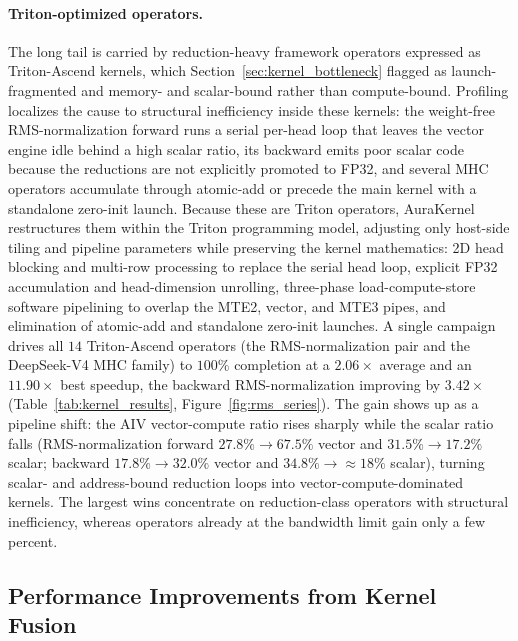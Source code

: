 \paragraph{Triton-optimized operators.}
The long tail is carried by reduction-heavy framework operators expressed as Triton-Ascend kernels, which Section~\ref{sec:kernel_bottleneck} flagged as launch-fragmented and memory- and scalar-bound rather than compute-bound. Profiling localizes the cause to structural inefficiency inside these kernels: the weight-free RMS-normalization forward runs a serial per-head loop that leaves the vector engine idle behind a high scalar ratio, its backward emits poor scalar code because the reductions are not explicitly promoted to FP32, and several MHC operators accumulate through atomic-add or precede the main kernel with a standalone zero-init launch. Because these are Triton operators, AuraKernel restructures them within the Triton programming model, adjusting only host-side tiling and pipeline parameters while preserving the kernel mathematics: 2D head blocking and multi-row processing to replace the serial head loop, explicit FP32 accumulation and head-dimension unrolling, three-phase load-compute-store software pipelining to overlap the MTE2, vector, and MTE3 pipes, and elimination of atomic-add and standalone zero-init launches. A single campaign drives all $14$ Triton-Ascend operators (the RMS-normalization pair and the DeepSeek-V4 MHC family) to $100\%$ completion at a $2.06\times$ average and an $11.90\times$ best speedup, the backward RMS-normalization improving by $3.42\times$ (Table~\ref{tab:kernel_results}, Figure~\ref{fig:rms_series}). The gain shows up as a pipeline shift: the AIV vector-compute ratio rises sharply while the scalar ratio falls (RMS-normalization forward $27.8\%\rightarrow67.5\%$ vector and $31.5\%\rightarrow17.2\%$ scalar; backward $17.8\%\rightarrow32.0\%$ vector and $34.8\%\rightarrow\approx18\%$ scalar), turning scalar- and address-bound reduction loops into vector-compute-dominated kernels. The largest wins concentrate on reduction-class operators with structural inefficiency, whereas operators already at the bandwidth limit gain only a few percent.

\subsection{Performance Improvements from Kernel Fusion}
\label{subsec:eval_operator_chain_fusion}


